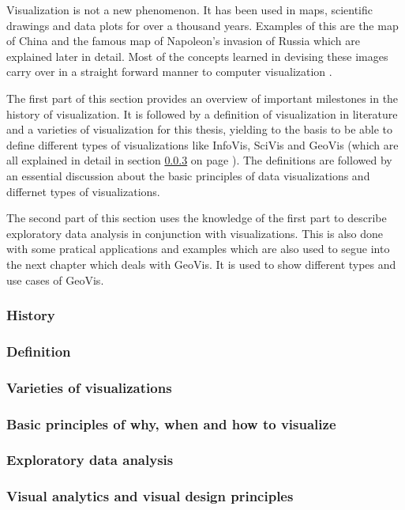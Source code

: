Visualization is not a new phenomenon. It has been used in maps, scientific drawings and data plots for over a thousand years. Examples of this are the map of China and the famous map of Napoleon's invasion of Russia which are explained later in detail. Most of the concepts learned in devising these images carry over in a straight forward manner to computer visualization .

The first part of this section provides an overview of important milestones in the history of visualization. It is followed by a definition of visualization in literature and a varieties of visualization for this thesis, yielding to the basis to be able to define different types of visualizations like \ac{InfoVis}, \ac{SciVis} and \ac{GeoVis} (which are all explained in detail in section \ref{s:definitions-types} on page \pageref{s:definitions-types}). The definitions are followed by an essential discussion about the basic principles of data visualizations and differnet types of visualizations.

The second part of this section uses the knowledge of the first part to describe exploratory data analysis in conjunction with visualizations. This is also done with some pratical applications and examples which are also used to segue into the next chapter which deals with \ac{GeoVis}. It is used to show different types and use cases of \ac{GeoVis}.

\subsubsection{History}
\label{s:history}


\subsubsection{Definition}
\label{s:definition}


\subsubsection{Varieties of visualizations}
\label{s:definitions-types}


\subsubsection{Basic principles of why, when and how to visualize}
\label{s:basics}


\subsubsection{Exploratory data analysis}
\label{s:eda}


\subsubsection{Visual analytics and visual design principles}
\label{s:va}

